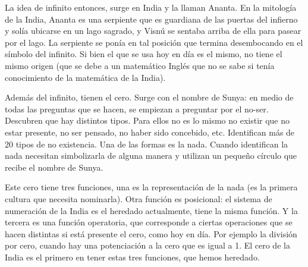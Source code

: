 La idea de infinito entonces, surge en India y la llaman Ananta. En la mitología de la India, Ananta es una serpiente que es guardiana de las puertas del infierno y solía ubicarse en un lago sagrado, y Visnú se sentaba arriba de ella para pasear por el lago. La serpiente se ponía en tal posición que termina desembocando en el símbolo del infinito. Si bien el que se usa hoy en día es el mismo, no tiene el mismo origen (que se debe a un matemático Inglés que no se sabe si tenía conocimiento de la matemática de la India).

Además del infinito, tienen el cero. Surge con el nombre de Sunya: en medio de todas las preguntas que se hacen, se empiezan a preguntar por el no-ser. Descubren que hay distintos tipos. Para ellos no es lo mismo no existir que no estar presente, no ser pensado, no haber sido concebido, etc. Identifican más de 20 tipos de no existencia. Una de las formas es la nada. Cuando identifican la nada necesitan simbolizarla de alguna manera y utilizan un pequeño círculo que recibe el nombre de Sunya. 

Este cero tiene tres funciones, una es la representación de la nada (es la primera cultura que necesita nominarla). Otra función es posicional: el sistema de numeración de la India es el heredado actualmente, tiene la misma función. Y la tercera es una función operatoria, que corresponde a ciertas operaciones que se hacen distintas si está presente el cero, como hoy en día. Por ejemplo la división por cero, cuando hay una potenciación a la cero que es igual a 1. El cero de la India es el primero en tener estas tres funciones, que hemos heredado.

